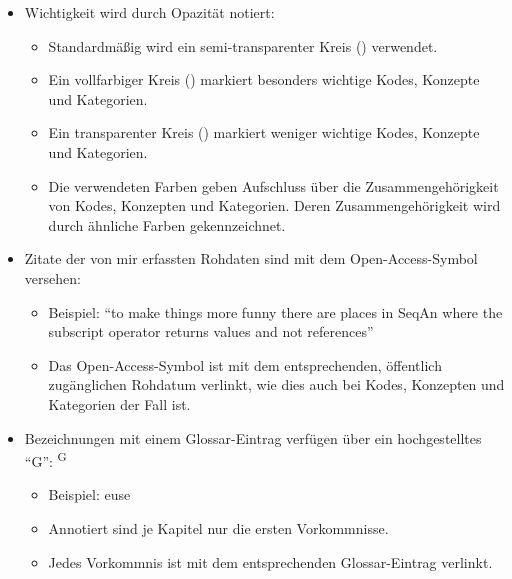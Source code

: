 \documentclass[11pt,a4paper]{book}
\begin{document}
\begin{itemize}
  \item Wichtigkeit wird durch Opazität notiert: \,\,
  \begin{itemize}
    \item Standardmäßig wird ein semi-transparenter Kreis () verwendet.
    \item Ein vollfarbiger Kreis () markiert besonders wichtige Kodes, Konzepte und Kategorien.
    \item Ein transparenter Kreis () markiert weniger wichtige Kodes, Konzepte und Kategorien.
    \item Die verwendeten Farben geben Aufschluss über die Zusammengehörigkeit von Kodes, Konzepten und Kategorien. Deren Zusammengehörigkeit wird durch ähnliche Farben gekennzeichnet.
  \end{itemize}
  
  \item Zitate der von mir erfassten Rohdaten sind mit dem Open-Access-Symbol versehen:  %
  \begin{itemize}
    \item Beispiel: ``to make things more funny there are places in SeqAn where the subscript operator returns values and not references''
    \item Das Open-Access-Symbol ist mit dem entsprechenden, öffentlich zugänglichen Rohdatum verlinkt, wie dies auch bei Kodes, Konzepten und Kategorien der Fall ist.
  \end{itemize}
  
  \item Bezeichnungen mit einem Glossar-Eintrag verfügen über ein hochgestelltes ``G'': \textsuperscript{G}
  \begin{itemize}
    \item Beispiel: \gls{euse}
    \item Annotiert sind je Kapitel nur die ersten Vorkommnisse.
    \item Jedes Vorkommnis ist mit dem entsprechenden Glossar-Eintrag verlinkt.
  \end{itemize}
\end{itemize}
\end{document}
